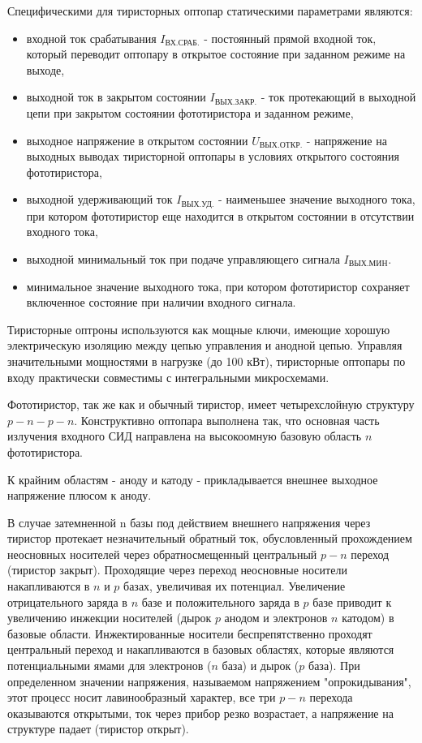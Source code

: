 Специфическими для тиристорных оптопар статическими параметрами являются:
\begin{itemize}
\item входной ток срабатывания $I_\text{ВХ.СРАБ.}$ - постоянный прямой входной ток, который переводит оптопару в открытое состояние при заданном режиме на выходе,
\item выходной ток в закрытом состоянии $I_\text{ВЫХ.ЗАКР.}$ - ток протекающий в выходной цепи при закрытом состоянии фототиристора и заданном режиме,
\item выходное напряжение в открытом состоянии $U_\text{ВЫХ.ОТКР.}$ - напряжение на выходных выводах тиристорной оптопары в условиях открытого состояния фототиристора,
\item выходной удерживающий ток $I_\text{ВЫХ.УД.}$ - наименьшее значение выходного тока, при котором фототиристор еще находится в открытом состоянии в отсутствии входного тока,
\item выходной минимальный ток при подаче управляющего сигнала $I_\text{ВЫХ.МИН}$. 
\item минимальное значение выходного тока, при котором фототиристор сохраняет включенное состояние при наличии входного сигнала.
\end{itemize}

Тиристорные оптроны используются как мощные ключи, имеющие хорошую электрическую изоляцию между цепью управления и анодной цепью. Управляя значительными мощностями в нагрузке (до 100 кВт), тиристорные оптопары по входу практически совместимы с интегральными микросхемами.

Фототиристор, так же как и обычный тиристор, имеет четырехслойную структуру $p-n-p-n$. Конструктивно оптопара выполнена так, что основная часть излучения входного СИД направлена на высокоомную базовую область $n$ фототиристора.

К крайним областям - аноду и катоду - прикладывается внешнее выходное напряжение плюсом к аноду.

В случае затемненной n базы под действием внешнего напряжения через тиристор протекает незначительный обратный ток, обусловленный
прохождением неосновных носителей через обратносмещенный центральный $p-n$ переход (тиристор закрыт). Проходящие через переход неосновные носители накапливаются в $n$ и $p$ базах, увеличивая их потенциал. Увеличение отрицательного заряда в $n$ базе и положительного заряда в $p$ базе приводит к увеличению инжекции носителей (дырок $p$ анодом и электронов $n$ катодом) в базовые области. Инжектированные носители беспрепятственно проходят центральный переход и накапливаются в базовых областях, которые являются потенциальными ямами для электронов ($n$ база) и дырок ($p$ база). При определенном значении напряжения, называемом напряжением "опрокидывания", этот процесс носит лавинообразный характер, все три $p-n$ перехода оказываются открытыми, ток через прибор резко возрастает, а напряжение на структуре падает (тиристор открыт).

